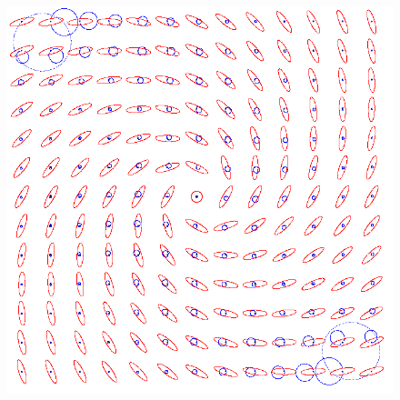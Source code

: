 \documentclass{scrartcl}
\begin{document}
\begin{figure}[!t]
\begin{minipage}{0.25\textwidth}
    \includegraphics[height=0.8\textwidth]{spiral-two-wide.png}
    \label{b)}
  \end{minipage}
\label{isotropic}
\end{figure}
\end{document}
